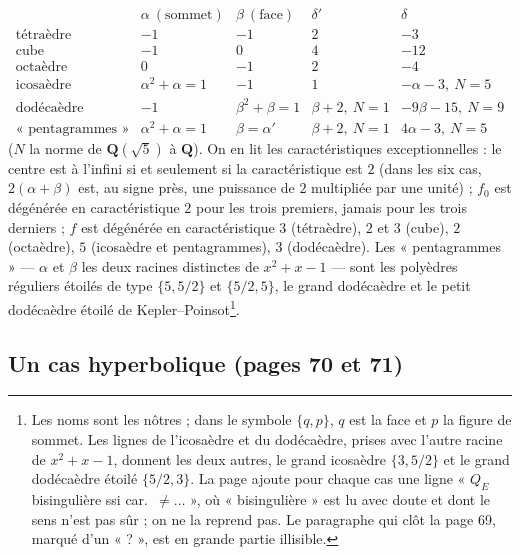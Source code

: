 \documentclass[11pt,a4paper]{article}
\begin{document}
\[
\begin{array}{l|c|c|c|c}
& \alpha\ (\text{sommet}) & \beta\ (\text{face}) & \delta' & \delta \\ \hline
\text{tétraèdre} & -1 & -1 & 2 & -3 \\
\text{cube} & -1 & 0 & 4 & -12 \\
\text{octaèdre} & 0 & -1 & 2 & -4 \\
\text{icosaèdre} & \alpha^2 + \alpha = 1 & -1 & 1 & -\alpha - 3,\ N = 5 \\
\text{dodécaèdre} & -1 & \beta^2 + \beta = 1 & \beta + 2,\ N = 1 & -9\beta - 15,\ N = 9 \\
\text{« pentagrammes »} & \alpha^2 + \alpha = 1 & \beta = \alpha' & \beta + 2,\ N = 1 & 4\alpha - 3,\ N = 5
\end{array}
\]
($N$ la norme de $\mathbf{Q}(\sqrt 5)$ à $\mathbf{Q}$). On en lit les
caractéristiques exceptionnelles : le centre est à l'infini si et seulement si
la caractéristique est $2$ (dans les six cas, $2(\alpha + \beta)$ est, au signe
près, une puissance de $2$ multipliée par une unité) ; $f_0$ est dégénérée en
caractéristique $2$ pour les trois premiers, jamais pour les trois derniers ;
$f$ est dégénérée en caractéristique $3$ (tétraèdre), $2$ et $3$ (cube), $2$
(octaèdre), $5$ (icosaèdre et pentagrammes), $3$ (dodécaèdre). Les
« pentagrammes » --- $\alpha$ et $\beta$ les deux racines distinctes de
$x^2 + x - 1$ --- sont les polyèdres réguliers étoilés de type
$\{5, 5/2\}$ et $\{5/2, 5\}$, le grand dodécaèdre et le petit dodécaèdre
étoilé de Kepler--Poinsot\footnote{Les noms sont les nôtres ; dans le symbole $\{q, p\}$, $q$ est la face et $p$ la figure de sommet. Les lignes de l'icosaèdre et du dodécaèdre, prises avec l'autre racine de $x^2 + x - 1$, donnent les deux autres, le grand icosaèdre $\{3, 5/2\}$ et le grand dodécaèdre étoilé $\{5/2, 3\}$. La page ajoute pour
chaque cas une ligne « $Q_E$ bisingulière ssi car.\ $\neq \ldots$ », où
« bisingulière » est lu avec doute et dont le sens n'est pas sûr ; on ne la
reprend pas. Le paragraphe qui clôt la page 69, marqué d'un « ? », est en
grande partie illisible.}.

\subsection*{Un cas hyperbolique (pages 70 et 71)}
\end{document}
